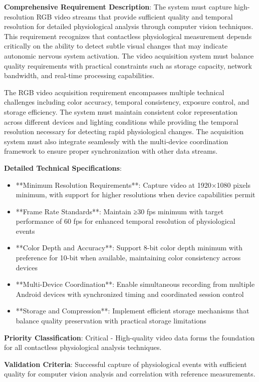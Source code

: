 \documentclass[12pt,a4paper]{article}
\begin{document}
\textbf{Comprehensive Requirement Description}: The system must capture high-resolution RGB video streams that provide
sufficient quality and temporal resolution for detailed physiological analysis through computer vision techniques. This
requirement recognizes that contactless physiological measurement depends critically on the ability to detect subtle
visual changes that may indicate autonomic nervous system activation. The video acquisition system must balance quality
requirements with practical constraints such as storage capacity, network bandwidth, and real-time processing
capabilities.

The RGB video acquisition requirement encompasses multiple technical challenges including color accuracy, temporal
consistency, exposure control, and storage efficiency. The system must maintain consistent color representation across
different devices and lighting conditions while providing the temporal resolution necessary for detecting rapid
physiological changes. The acquisition system must also integrate seamlessly with the multi-device coordination
framework to ensure proper synchronization with other data streams.

\textbf{Detailed Technical Specifications}:

\begin{itemize}
\item **Minimum Resolution Requirements**: Capture video at 1920×1080 pixels minimum, with support for higher resolutions
  when device capabilities permit
\item **Frame Rate Standards**: Maintain ≥30 fps minimum with target performance of 60 fps for enhanced temporal resolution
  of physiological events
\item **Color Depth and Accuracy**: Support 8-bit color depth minimum with preference for 10-bit when available, maintaining
  color consistency across devices
\item **Multi-Device Coordination**: Enable simultaneous recording from multiple Android devices with synchronized timing
  and coordinated session control
\item **Storage and Compression**: Implement efficient storage mechanisms that balance quality preservation with practical
  storage limitations

\end{itemize}
\textbf{Priority Classification}: Critical - High-quality video data forms the foundation for all contactless physiological
analysis techniques.

\textbf{Validation Criteria}: Successful capture of physiological events with sufficient quality for computer vision analysis
and correlation with reference measurements.
\end{document}
